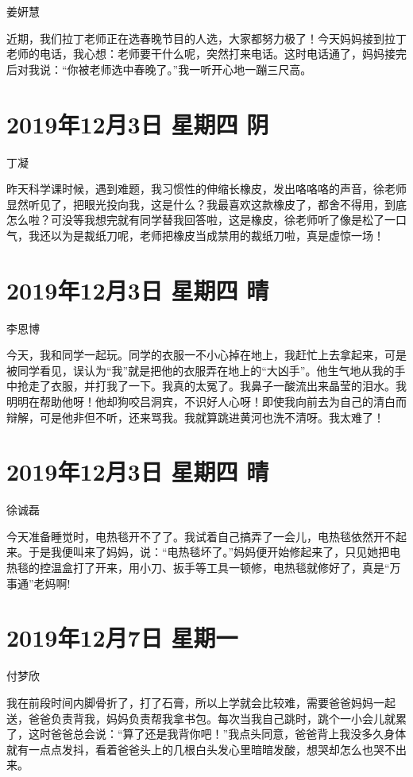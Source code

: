 姜姸慧

近期，我们拉丁老师正在选春晚节目的人选，大家都努力极了！今天妈妈接到拉丁老师的电话，我心想：老师要干什么呢，突然打来电话。这时电话通了，妈妈接完后对我说：``你被老师选中春晚了。''我一听开心地一蹦三尺高。

\section{2019年12月3日 星期四 阴}

丁凝

昨天科学课时候，遇到难题，我习惯性的伸缩长橡皮，发出咯咯咯的声音，徐老师显然听见了，把眼光投向我，这是什么？我最喜欢这款橡皮了，都舍不得用，到底怎么啦？可没等我想完就有同学替我回答啦，这是橡皮，徐老师听了像是松了一口气，我还以为是裁纸刀呢，老师把橡皮当成禁用的裁纸刀啦，真是虚惊一场！

\section{2019年12月3日 星期四 晴}

李恩博

今天，我和同学一起玩。同学的衣服一不小心掉在地上，我赶忙上去拿起来，可是被同学看见，误认为``我''就是把他的衣服弄在地上的``大凶手''。他生气地从我的手中抢走了衣服，并打我了一下。我真的太冤了。我鼻子一酸流出来晶莹的泪水。我明明在帮助他呀！他却狗咬吕洞宾，不识好人心呀！即使我向前去为自己的清白而辩解，可是他非但不听，还来骂我。我就算跳进黄河也洗不清呀。我太难了！

\section{2019年12月3日 星期四 晴}

徐诚磊

今天准备睡觉时，电热毯开不了了。我试着自己搞弄了一会儿，电热毯依然开不起来。于是我便叫来了妈妈，说：``电热毯坏了。''妈妈便开始修起来了，只见她把电热毯的控温盒打了开来，用小刀、扳手等工具一顿修，电热毯就修好了，真是``万事通''老妈啊!

\section{2019年12月7日 星期一}

付梦欣

我在前段时间内脚骨折了，打了石膏，所以上学就会比较难，需要爸爸妈妈一起送，爸爸负责背我，妈妈负责帮我拿书包。每次当我自己跳时，跳个一小会儿就累了，这时爸爸总会说：``算了还是我背你吧！''我点头同意，爸爸背上我没多久身体就有一点点发抖，看着爸爸头上的几根白头发心里暗暗发酸，想哭却怎么也哭不出来。

